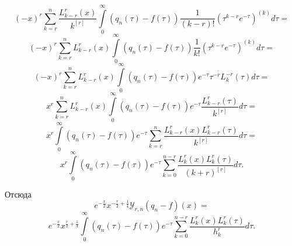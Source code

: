 \begin{equation*}
 (-x)^r\sum\limits_{k=r}^{n}\frac{L_{k-r}^{r}(x)}{k^{[r]}}\int\limits_0^\infty
  (q_n(\tau)-f(\tau))\frac{1}{(k-r)!}(\tau^{k-r}e^{-\tau})^{(k)}d\tau=
\end{equation*}
\begin{equation*}
 (-x)^r\sum\limits_{k=r}^{n}L_{k-r}^{r}(x)\int\limits_0^\infty
  (q_n(\tau)-f(\tau))\frac{1}{k!}(\tau^{k-r}e^{-\tau})^{(k)}d\tau=
\end{equation*}
\begin{equation*}
 (-x)^r\sum\limits_{k=r}^{n}L_{k-r}^{r}(x)\int\limits_0^\infty
  (q_n(\tau)-f(\tau))e^{-\tau}\tau^{-r}L_{k}^{-r}(\tau)d\tau=
\end{equation*}
\begin{equation*}
 x^r\sum\limits_{k=r}^{n}L_{k-r}^{r}(x)\int\limits_0^\infty
  (q_n(\tau)-f(\tau))e^{-\tau}\frac{L_{k-r}^{r}(\tau)}{k^{[r]}}d\tau=
\end{equation*}
\begin{equation*}
 x^r\int\limits_0^\infty
  (q_n(\tau)-f(\tau))e^{-\tau}\sum\limits_{k=r}^{n}\frac{L_{k-r}^{r}(x)L_{k-r}^{r}(\tau)}{k^{[r]}}d\tau=
\end{equation*}
\begin{equation*}
 x^r\int\limits_0^\infty
  (q_n(\tau)-f(\tau))e^{-\tau}
  \sum\limits_{k=0}^{n-r}\frac{L_{k}^{r}(x)L_{k}^{r}(\tau)}{(k+r)^{[r]}}d\tau.
\end{equation*}

Отсюда
$$
e^{-\frac x2}x^{-\frac r2+\frac14}\mathcal{Y}_{r,n}(q_n-f)(x)=
$$
\begin{equation}\label{sob-lag-smj-5.9}
  e^{-\frac x2}x^{\frac r2+\frac14}\int\limits_0^\infty
  (q_n(\tau)-f(\tau))e^{-\tau}
  \sum\limits_{k=0}^{n-r}\frac{L_k^r(x)L_k^r(\tau)}{h_k^r}d\tau.
\end{equation}

